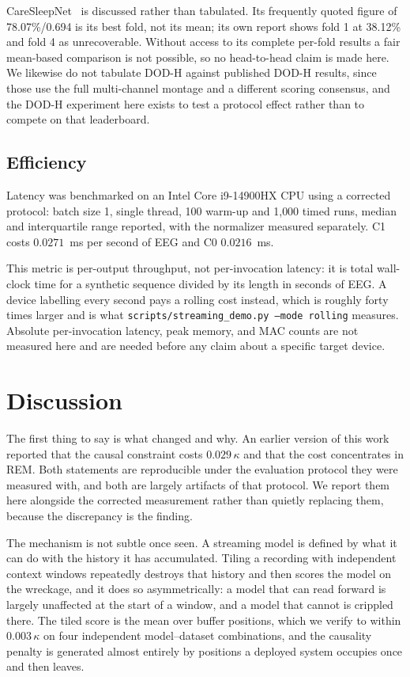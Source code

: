 \documentclass[conference]{IEEEtran}
\begin{document}
CareSleepNet~\cite{caresleepnet} is discussed rather than tabulated. Its frequently quoted figure of
78.07\%/0.694 is its best fold, not its mean; its own report shows fold 1 at 38.12\% and fold 4 as
unrecoverable. Without access to its complete per-fold results a fair mean-based comparison is not
possible, so no head-to-head claim is made here. We likewise do not tabulate DOD-H against published
DOD-H results, since those use the full multi-channel montage and a different scoring consensus, and
the DOD-H experiment here exists to test a protocol effect rather than to compete on that
leaderboard.

\subsection{Efficiency}

Latency was benchmarked on an Intel Core i9-14900HX CPU using a corrected protocol: batch size 1,
single thread, 100 warm-up and 1{,}000 timed runs, median and interquartile range reported, with the
normalizer measured separately. C1 costs $0.0271$~ms per second of EEG and C0 $0.0216$~ms.

This metric is per-output throughput, not per-invocation latency: it is total wall-clock time for a
synthetic sequence divided by its length in seconds of EEG. A device labelling every second pays a
rolling cost instead, which is roughly forty times larger and is what
\texttt{scripts/streaming\_demo.py --mode rolling} measures. Absolute per-invocation latency, peak
memory, and MAC counts are not measured here and are needed before any claim about a specific target
device.

\section{Discussion}

The first thing to say is what changed and why. An earlier version of this work reported that the
causal constraint costs $0.029\,\kappa$ and that the cost concentrates in REM. Both statements are
reproducible under the evaluation protocol they were measured with, and both are largely artifacts
of that protocol. We report them here alongside the corrected measurement rather than quietly
replacing them, because the discrepancy is the finding.

The mechanism is not subtle once seen. A streaming model is defined by what it can do with the
history it has accumulated. Tiling a recording with independent context windows repeatedly destroys
that history and then scores the model on the wreckage, and it does so asymmetrically: a model that
can read forward is largely unaffected at the start of a window, and a model that cannot is crippled
there. The tiled score is the mean over buffer positions, which we verify to within $0.003\,\kappa$
on four independent model--dataset combinations, and the causality penalty is generated almost
entirely by positions a deployed system occupies once and then leaves.
\end{document}
